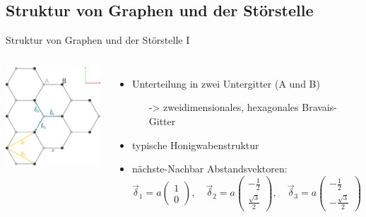 \documentclass[aspectratio=1610, 9pt]{beamer}
\begin{document}
\subsection{Struktur von Graphen und der Störstelle}
\begin{frame}{Struktur von Graphen und der Störstelle I}
  \begin{columns}
        \centering
        \includegraphics[width = 0.96 \textwidth]{Plots/graphene_lattice.pdf}
      \begin{itemize}
        \item Unterteilung in zwei Untergitter (A und B)
        \begin{itemize}
          \item[->] zweidimensionales, hexagonales Bravais-Gitter 
        \end{itemize}
        \item typische Honigwabenstruktur
        \item nächste-Nachbar Abstandsvektoren:
      \begin{equation*}
        \vec{\delta}_1 = a \begin{pmatrix} 1            \\[4pt] 0                   \end{pmatrix}, \quad
        \vec{\delta}_2 = a \begin{pmatrix} -\frac{1}{2} \\[4pt] \frac{\sqrt{3}}{2}  \end{pmatrix}, \quad 
        \vec{\delta}_3 = a \begin{pmatrix} -\frac{1}{2} \\[4pt] -\frac{\sqrt{3}}{2} \end{pmatrix} \label{eqn:nnvec}
    \end{equation*}
  \end{itemize}
  \end{columns}
\end{frame}
\end{document}
